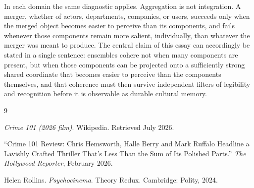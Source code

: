\documentclass[11pt]{article}
\begin{document}
In each domain the same diagnostic applies. Aggregation is not integration. A merger, whether of actors, departments, companies, or users, succeeds only when the merged object becomes easier to perceive than its components, and fails whenever those components remain more salient, individually, than whatever the merger was meant to produce. The central claim of this essay can accordingly be stated in a single sentence: ensembles cohere not when many components are present, but when those components can be projected onto a sufficiently strong shared coordinate that becomes easier to perceive than the components themselves, and that coherence must then survive independent filters of legibility and recognition before it is observable as durable cultural memory.

\begin{thebibliography}{9}

\emph{Crime 101 (2026 film)}. Wikipedia. Retrieved July 2026.

``Crime 101 Review: Chris Hemsworth, Halle Berry and Mark Ruffalo Headline a Lavishly Crafted Thriller That's Less Than the Sum of Its Polished Parts.'' \emph{The Hollywood Reporter}, February 2026.

Helen Rollins. \emph{Psychocinema}. Theory Redux. Cambridge: Polity, 2024.

\end{thebibliography}
\end{document}
